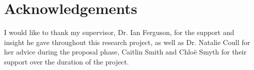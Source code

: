 \documentclass[11pt]{report}
\newcommand\mainmatter{%
\cleardoublepage
\pagenumbering{arabic}
}
\begin{document}
\setlength{\parskip}{1em}

\chapter*{Acknowledgements}

I would like to thank my supervisor, Dr. Ian Ferguson, for the support and insight he gave throughout this research project, as well as Dr. Natalie Coull for her advice during the proposal phase, Caitlin Smith and Chloë Smyth for their support over the duration of the project.

\mainmatter


\newpage


\newpage


\newpage


\newpage


\newpage


\printbibliography[heading=bibintoc, title=References]


\end{document}
